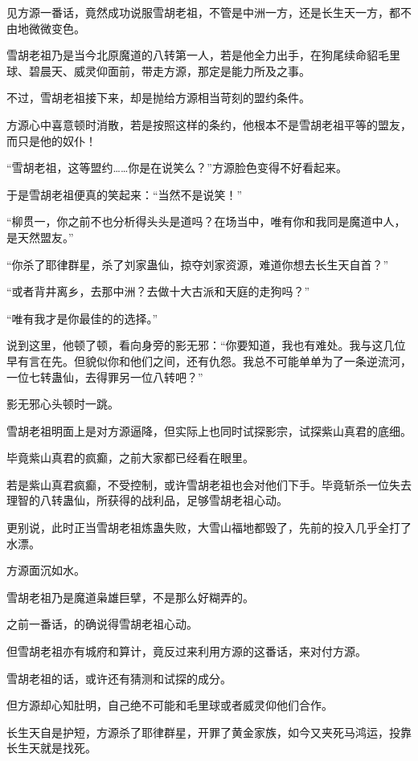 
\begin{this_body}

见方源一番话，竟然成功说服雪胡老祖，不管是中洲一方，还是长生天一方，都不由地微微变色。

雪胡老祖乃是当今北原魔道的八转第一人，若是他全力出手，在狗尾续命貂毛里球、碧晨天、威灵仰面前，带走方源，那定是能力所及之事。

不过，雪胡老祖接下来，却是抛给方源相当苛刻的盟约条件。

方源心中喜意顿时消散，若是按照这样的条约，他根本不是雪胡老祖平等的盟友，而只是他的奴仆！

“雪胡老祖，这等盟约……你是在说笑么？”方源脸色变得不好看起来。

于是雪胡老祖便真的笑起来：“当然不是说笑！”

“柳贯一，你之前不也分析得头头是道吗？在场当中，唯有你和我同是魔道中人，是天然盟友。”

“你杀了耶律群星，杀了刘家蛊仙，掠夺刘家资源，难道你想去长生天自首？”

“或者背井离乡，去那中洲？去做十大古派和天庭的走狗吗？”

“唯有我才是你最佳的的选择。”

说到这里，他顿了顿，看向身旁的影无邪：“你要知道，我也有难处。我与这几位早有言在先。但貌似你和他们之间，还有仇怨。我总不可能单单为了一条逆流河，一位七转蛊仙，去得罪另一位八转吧？”

影无邪心头顿时一跳。

雪胡老祖明面上是对方源逼降，但实际上也同时试探影宗，试探紫山真君的底细。

毕竟紫山真君的疯癫，之前大家都已经看在眼里。

若是紫山真君疯癫，不受控制，或许雪胡老祖也会对他们下手。毕竟斩杀一位失去理智的八转蛊仙，所获得的战利品，足够雪胡老祖心动。

更别说，此时正当雪胡老祖炼蛊失败，大雪山福地都毁了，先前的投入几乎全打了水漂。

方源面沉如水。

雪胡老祖乃是魔道枭雄巨擘，不是那么好糊弄的。

之前一番话，的确说得雪胡老祖心动。

但雪胡老祖亦有城府和算计，竟反过来利用方源的这番话，来对付方源。

雪胡老祖的话，或许还有猜测和试探的成分。

但方源却心知肚明，自己绝不可能和毛里球或者威灵仰他们合作。

长生天自是护短，方源杀了耶律群星，开罪了黄金家族，如今又夹死马鸿运，投靠长生天就是找死。


\end{this_body}
